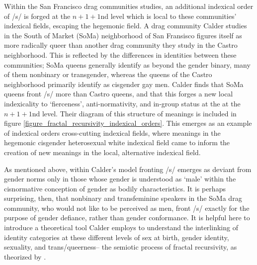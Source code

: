 \documentclass[12pt,twoside]{reedthesis}
\begin{document}
Within the San Francisco drag communities \textcite{calder_sissy_2019} studies, an additional indexical order of /s/ is forged at the $n + 1 + 1$nd level which is local to these communities' indexical fields, escaping the hegemonic field. A drag community Calder studies in the South of Market (SoMa) neighborhood of San Fransisco figures itself as more radically queer than another drag community they study in the Castro neighborhood. This is reflected by the differences in identities between these communities; SoMa queens generally identify as beyond the gender binary, many of them nonbinary or transgender, whereas the queens of the Castro neighborhood primarily identify as cisgender gay men. Calder finds that SoMa queens front /s/ more than Castro queens, and that this forges a new local indexicality to `fierceness', anti-normativity, and in-group status at the at the $n + 1 + 1$nd level. Their diagram of this structure of meanings is included in figure \ref{figure_fractal_recursivity_indexical_orders}. This emerges as an example of indexical orders cross-cutting indexical fields, where meanings in the hegemonic cisgender heterosexual white indexical field came to inform the creation of new meanings in the local, alternative indexical field.

As mentioned above, within Calder's model fronting /s/ emerges as deviant from gender norms only in those whose gender is understood as `male' within the cisnormative conception of gender as bodily characteristics. It is perhaps surprising, then, that nonbinary and transfeminine speakers in the SoMa drag community, who would not like to be perceived as men, front /s/ exactly for the purpose of gender defiance, rather than gender conformance. It is helpful here to introduce a theoretical tool Calder employs to understand the interlinking of identity categories at these different levels of sex at birth, gender identity, sexuality, and trans/queerness-- the semiotic process of fractal recursivity, as theorized by \textcite{irvine_language_2000, gal_boundaries_1995}.
	
\end{document}
